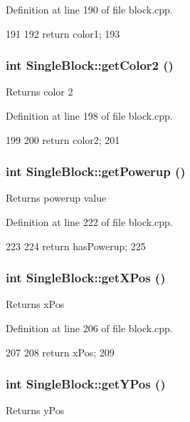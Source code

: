 Definition at line 190 of file block.cpp.


\begin{DoxyCode}
191 {
192     return color1;
193 }
\end{DoxyCode}
\hypertarget{class_single_block_a6438d2e49ace6f57711ee53f75b02734}{
\subsubsection[{getColor2}]{\setlength{\rightskip}{0pt plus 5cm}int SingleBlock::getColor2 ()}}
\label{class_single_block_a6438d2e49ace6f57711ee53f75b02734}
Returns color 2 

Definition at line 198 of file block.cpp.


\begin{DoxyCode}
199 {
200     return color2;
201 }
\end{DoxyCode}
\hypertarget{class_single_block_a126f70ebd4ac107f8d9b770f157afdf0}{
\subsubsection[{getPowerup}]{\setlength{\rightskip}{0pt plus 5cm}int SingleBlock::getPowerup ()}}
\label{class_single_block_a126f70ebd4ac107f8d9b770f157afdf0}
Returns powerup value 

Definition at line 222 of file block.cpp.


\begin{DoxyCode}
223 {
224     return hasPowerup;
225 }
\end{DoxyCode}
\hypertarget{class_single_block_aafaab9f0e0f348572a805d01a5d1a5eb}{
\subsubsection[{getXPos}]{\setlength{\rightskip}{0pt plus 5cm}int SingleBlock::getXPos ()}}
\label{class_single_block_aafaab9f0e0f348572a805d01a5d1a5eb}
Returns xPos 

Definition at line 206 of file block.cpp.


\begin{DoxyCode}
207 {
208     return xPos;
209 }
\end{DoxyCode}
\hypertarget{class_single_block_a73a4ed9e378d1afe20d3451f74b61d93}{
\subsubsection[{getYPos}]{\setlength{\rightskip}{0pt plus 5cm}int SingleBlock::getYPos ()}}
\label{class_single_block_a73a4ed9e378d1afe20d3451f74b61d93}
Returns yPos 

